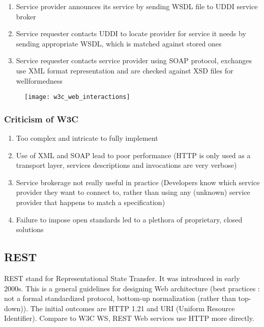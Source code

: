 \begin{minipage}{0.7\textwidth}
    \begin{enumerate}
        \item Service provider announces its service by sending WSDL file to UDDI service broker
        \item Service requester contacts UDDI to locate provider for service it needs by sending appropriate WSDL, which is matched against stored ones
        \item Service requester contacts service provider using SOAP protocol, exchanges use XML format representation and are checked against XSD files for wellformedness
    \end{enumerate}
\end{minipage}
\hfill
\begin{minipage}{0.28\textwidth}
    \begin{figure}[H]
        \centering
        \texttt{[image: w3c\_web\_interactions]}
    \end{figure}
\end{minipage}

\subsubsection*{Criticism of W3C}

\begin{enumerate}
    \item Too complex and intricate to fully implement
    \item Use of XML and SOAP lead to poor performance (HTTP is only used as a transport layer, services descriptions and invocations are very verbose)
    \item Service brokerage not really useful in practice (Developers know which service provider they want to connect to, rather than using any (unknown) service provider that happens to match a specification)
    \item Failure to impose open standards led to a plethora of proprietary, closed solutions
\end{enumerate}

\subsection{REST}

REST stand for Representational State Transfer. It was introduced in early 2000s. This is a general guidelines for designing Web architecture (best practices : not a formal standardized protocol, bottom-up normalization (rather than top-down)). The initial outcomes are HTTP 1.21 and URI (Uniform Resource Identifier). Compare to W3C WS, REST Web services use HTTP more directly.

